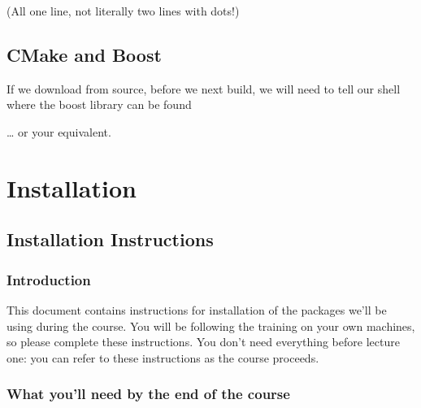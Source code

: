 (All one line, not literally two lines with dots!)

\subsection{CMake and Boost}\label{cmake-and-boost}

If we download from source, before we next build, we will need to tell
our shell where the boost library can be found

\begin{Shaded}
\begin{Highlighting}[]
 
 
 
\end{Highlighting}
\end{Shaded}

\ldots{} or your equivalent.

\section{Installation}\label{installation}

\subsection{Installation Instructions}\label{installation-instructions}

\subsubsection{Introduction}\label{introduction-5}

This document contains instructions for installation of the packages
we'll be using during the course. You will be following the training on
your own machines, so please complete these instructions. You don't need
everything before lecture one: you can refer to these instructions as
the course proceeds.

\subsubsection{What you'll need by the end of the
course}\label{what-youll-need-by-the-end-of-the-course}

